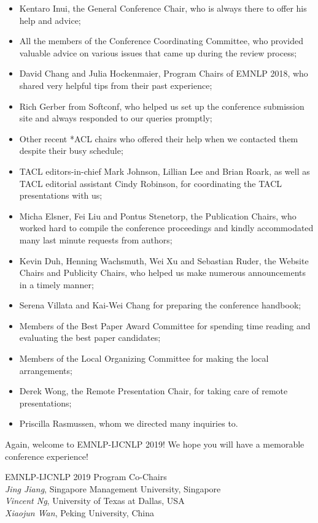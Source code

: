 \begin{itemize}
   \item Kentaro Inui, the General Conference Chair, who is always there to offer his help and advice;
   \item All the members of the Conference Coordinating Committee, who provided valuable advice on various issues that came up during the review process;
   \item David Chang and Julia Hockenmaier, Program Chairs of EMNLP 2018, who shared very helpful tips from their past experience;
   \item Rich Gerber from Softconf, who helped us set up the conference submission site and always responded to our queries promptly;
   \item Other recent *ACL chairs who offered their help when we contacted them despite their busy schedule;
   \item TACL editors-in-chief Mark Johnson, Lillian Lee and Brian Roark, as well as TACL editorial assistant Cindy Robinson, for coordinating the TACL presentations with us;
   \item Micha Elsner, Fei Liu and Pontus Stenetorp, the Publication Chairs, who worked hard to compile the conference proceedings and kindly accommodated many last minute requests from authors;
   \item Kevin Duh, Henning Wachsmuth, Wei Xu and Sebastian Ruder, the Website Chairs and Publicity Chairs, who helped us make numerous announcements in a timely manner;
   \item Serena Villata and Kai-Wei Chang for preparing the conference handbook;
   \item Members of the Best Paper Award Committee for spending time reading and evaluating the best paper candidates;
   \item Members of the Local Organizing Committee for making the local arrangements;
   \item Derek Wong, the Remote Presentation Chair, for taking care of remote presentations;
   \item Priscilla Rasmussen, whom we directed many inquiries to.
   
\end{itemize}

Again, welcome to EMNLP-IJCNLP 2019! We hope you will have a memorable conference experience!

\vspace{3em}

\noindent EMNLP-IJCNLP 2019 Program Co-Chairs \\

\noindent \textit{Jing Jiang}, Singapore Management University, Singapore \\
\noindent \textit{Vincent Ng}, University of Texas at Dallas, USA\\
\noindent \textit{Xiaojun Wan}, Peking University, China

